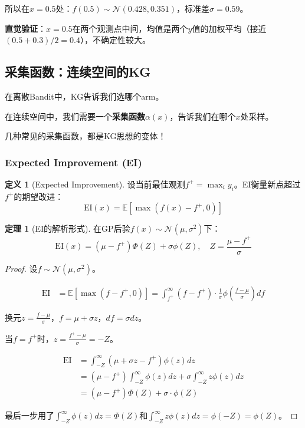 \documentclass[11pt,a4paper]{article}
\theoremstyle{definition}
\newtheorem{definition}{定义}[section]
\newtheorem{theorem}{定理}[section]
\begin{document}
\begin{calculation}[GP后验的完整计算]
所以在$x=0.5$处：$f(0.5) \sim \mathcal{N}(0.428, 0.351)$，标准差$\sigma = 0.59$。

\textbf{直觉验证}：$x=0.5$在两个观测点中间，均值是两个$y$值的加权平均（接近$(0.5+0.3)/2=0.4$），不确定性较大。
\end{calculation}

\subsection{采集函数：连续空间的KG}

\begin{plainwords}[从KG到采集函数]
在离散Bandit中，KG告诉我们选哪个arm。

在连续空间中，我们需要一个\textbf{采集函数}$\alpha(x)$，告诉我们在哪个$x$处采样。

几种常见的采集函数，都是KG思想的变体！
\end{plainwords}

\subsubsection{Expected Improvement (EI)}

\begin{definition}[Expected Improvement]
设当前最佳观测$f^+ = \max_i y_i$。EI衡量新点超过$f^+$的期望改进：
\[
\text{EI}(x) = \mathbb{E}[\max(f(x) - f^+, 0)]
\]
\end{definition}

\begin{theorem}[EI的解析形式]
在GP后验$f(x) \sim \mathcal{N}(\mu, \sigma^2)$下：
\[
\text{EI}(x) = (\mu - f^+)\Phi(Z) + \sigma\phi(Z), \quad Z = \frac{\mu - f^+}{\sigma}
\]
\end{theorem}

\begin{proof}
设$f \sim \mathcal{N}(\mu, \sigma^2)$。

\begin{align*}
\text{EI} &= \mathbb{E}[\max(f - f^+, 0)] = \int_{f^+}^{\infty} (f - f^+) \cdot \frac{1}{\sigma}\phi\left(\frac{f-\mu}{\sigma}\right) df
\end{align*}

换元$z = \frac{f - \mu}{\sigma}$，$f = \mu + \sigma z$，$df = \sigma dz$。

当$f = f^+$时，$z = \frac{f^+ - \mu}{\sigma} = -Z$。

\begin{align*}
\text{EI} &= \int_{-Z}^{\infty} (\mu + \sigma z - f^+) \phi(z) dz \\
&= (\mu - f^+) \int_{-Z}^{\infty} \phi(z) dz + \sigma \int_{-Z}^{\infty} z \phi(z) dz \\
&= (\mu - f^+) \Phi(Z) + \sigma \cdot \phi(Z)
\end{align*}

最后一步用了$\int_{-Z}^\infty \phi(z)dz = \Phi(Z)$和$\int_{-Z}^\infty z\phi(z)dz = \phi(-Z) = \phi(Z)$。
\end{proof}
\end{document}
